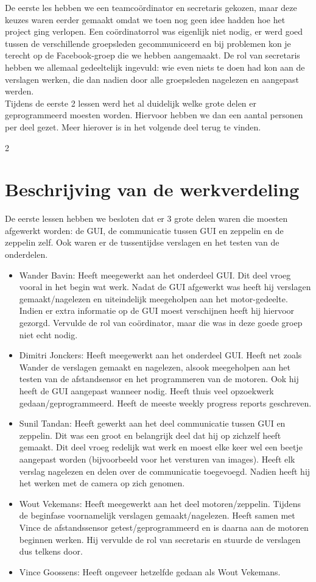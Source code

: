 \documentclass[tt]{penoverslag}
\begin{document}
\begin{itemize}
De eerste les hebben we een teamco\"ordinator en secretaris gekozen, maar deze keuzes waren eerder gemaakt omdat we toen nog geen idee hadden hoe het project ging verlopen. Een co\"ordinatorrol was eigenlijk niet nodig, er werd goed tussen de verschillende groepsleden gecommuniceerd en bij problemen kon je terecht op de Facebook-groep die we hebben aangemaakt. De rol van secretaris hebben we allemaal gedeeltelijk ingevuld: wie even niets te doen had kon aan de verslagen werken, die dan nadien door alle groepsleden nagelezen en aangepast werden. \\ 
Tijdens de eerste 2 lessen werd het al duidelijk welke grote delen er geprogrammeerd moesten worden. Hiervoor hebben we dan een aantal personen per deel gezet.  Meer hierover is in het volgende deel terug te vinden.

\end{itemize}2


\section{Beschrijving van de werkverdeling}
De eerste lessen hebben we besloten dat er 3 grote delen waren die moesten afgewerkt worden: de GUI, de communicatie tussen GUI en zeppelin en de zeppelin zelf. Ook waren er de tussentijdse verslagen en het testen van de onderdelen. \\
\begin{itemize}
\item Wander Bavin: Heeft meegewerkt aan het onderdeel GUI. Dit deel vroeg vooral in het begin wat werk. Nadat de GUI afgewerkt was heeft hij verslagen gemaakt/nagelezen en uiteindelijk meegeholpen aan het motor-gedeelte. Indien er extra informatie op de GUI moest verschijnen heeft hij hiervoor gezorgd. Vervulde de rol van co\"ordinator, maar die was in deze goede groep niet echt nodig.
\item Dimitri Jonckers: Heeft meegewerkt aan het onderdeel GUI. Heeft net zoals Wander de verslagen gemaakt en nagelezen, alsook meegeholpen aan het testen van de afstandsensor en het programmeren van de motoren. Ook hij heeft de GUI aangepast wanneer nodig. Heeft thuis veel opzoekwerk gedaan/geprogrammeerd. Heeft de meeste weekly progress reports geschreven.
\item Sunil Tandan: Heeft gewerkt aan het deel communicatie tussen GUI en zeppelin. Dit was een groot en belangrijk deel dat hij op zichzelf heeft gemaakt. Dit deel vroeg redelijk wat werk en moest elke keer wel een beetje aangepast worden (bijvoorbeeld voor het versturen van images). Heeft elk verslag nagelezen en delen over de communicatie toegevoegd. Nadien heeft hij het werken met de camera op zich genomen.
\item Wout Vekemans: Heeft meegewerkt aan het deel motoren/zeppelin. Tijdens de beginfase voornamelijk verslagen gemaakt/nagelezen. Heeft samen met Vince de afstandssensor getest/geprogrammeerd en is daarna aan de motoren beginnen werken. Hij vervulde de rol van secretaris en stuurde de verslagen dus telkens door.
\item Vince Goossens: Heeft ongeveer hetzelfde gedaan als Wout Vekemans.
\end{itemize}
\end{document}
